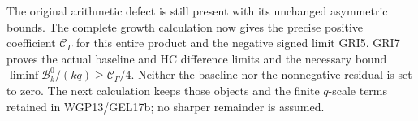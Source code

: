 The original arithmetic defect is still present with its
unchanged asymmetric bounds. The complete growth calculation now
gives the precise positive coefficient $\mathcal C_\Gamma$ for
this entire product and the negative signed limit GRI5.
GRI7 proves the actual baseline and HC difference limits and
the necessary bound $\liminf\mathcal B_k^0/(kq)\geq\mathcal C_\Gamma/4$.
Neither the baseline nor the nonnegative residual is set to zero.
The next calculation keeps those objects and the finite $q$-scale
terms retained in WGP13/GEL17b; no sharper remainder is assumed.